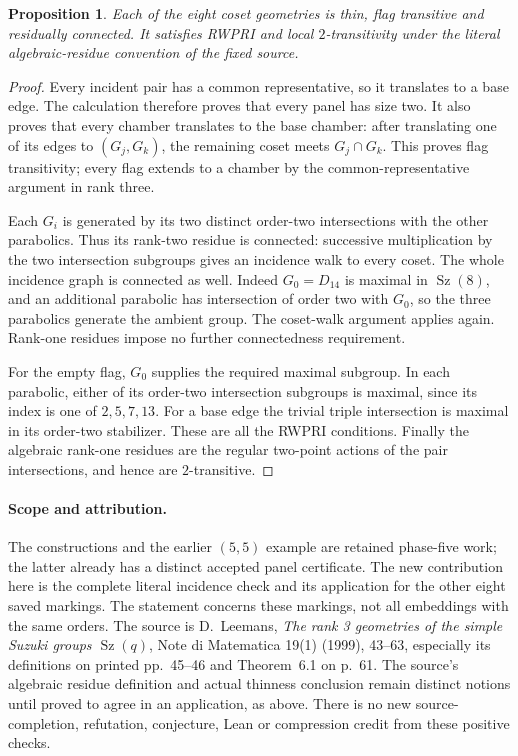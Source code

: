 \documentclass[11pt,a4paper]{article}
\newtheorem{proposition}{Proposition}
\newcommand{\Sz}{\operatorname{Sz}}
\begin{document}
\begin{proposition}
Each of the eight coset geometries is thin, flag transitive and residually
connected. It satisfies RWPRI and local $2$-transitivity under the literal
algebraic-residue convention of the fixed source.
\end{proposition}
\begin{proof}
Every incident pair has a common representative, so it translates to a
base edge. The calculation therefore proves that every panel has size
two. It also proves that every chamber translates to the base chamber:
after translating one of its edges to $(G_j,G_k)$, the remaining coset
meets $G_j\cap G_k$. This proves flag transitivity; every flag extends
to a chamber by the common-representative argument in rank three.

Each $G_i$ is generated by its two distinct order-two intersections
with the other parabolics. Thus its rank-two residue is connected:
successive multiplication by the two intersection subgroups gives an
incidence walk to every coset. The whole incidence graph is connected
as well. Indeed $G_0=D_{14}$ is maximal in $\Sz(8)$, and an additional
parabolic has intersection of order two with $G_0$, so the three
parabolics generate the ambient group. The coset-walk argument applies
again. Rank-one residues impose no further connectedness requirement.

For the empty flag, $G_0$ supplies the required maximal subgroup. In
each parabolic, either of its order-two intersection subgroups is maximal,
since its index is one of $2,5,7,13$. For a base edge the trivial triple
intersection is maximal in its order-two stabilizer. These are all the
RWPRI conditions. Finally the algebraic rank-one residues are the regular
two-point actions of the pair intersections, and hence are $2$-transitive.
\end{proof}

\paragraph{Scope and attribution.}
The constructions and the earlier $(5,5)$ example are retained phase-five
work; the latter already has a distinct accepted panel certificate.
The new contribution here is the complete literal incidence check and
its application for the other eight saved markings. The statement concerns
these markings, not all embeddings with the same orders. The source is
D.~Leemans, \emph{The rank 3 geometries of the simple Suzuki groups
$\Sz(q)$}, Note di Matematica 19(1) (1999), 43--63, especially its
definitions on printed pp.~45--46 and Theorem~6.1 on p.~61.
The source's algebraic residue definition and actual thinness conclusion
remain distinct notions until proved to agree in an application, as above.
There is no new source-completion, refutation, conjecture, Lean or
compression credit from these positive checks.
\end{document}

